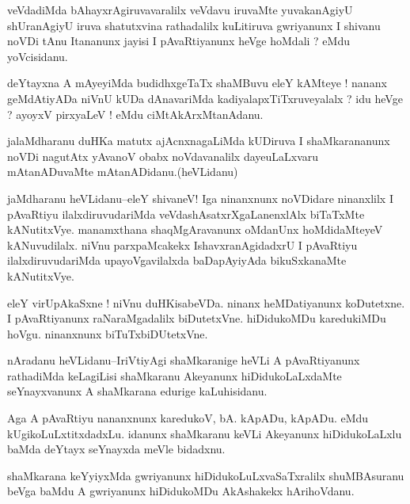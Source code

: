 \documentclass{article}
\begin{document}
\begin{mn}%
veVdadiMda bAhayxrAgiruvavaralilx veVdavu iruvaMte yuvakanAgiyU shUranAgiyU iruva 
shatutxvina rathadalilx kuLitiruva gwriyanunx I shivanu noVDi tAnu Itananunx jayisi I 
pAvaRtiyanunx heVge hoMdali ? eMdu yoVcisidanu.
\end{mn}

\begin{mn}%
deYtayxna A mAyeyiMda budidhxgeTaTx shaMBuvu eleY kAMteye ! nananx geMdAtiyADa niVnU kUDa 
dAnavariMda kadiyalapxTiTxruveyalalx ? idu heVge ? ayoyxV pirxyaLeV ! eMdu 
ciMtAkArxMtanAdanu.
\end{mn}

\begin{mn}%
jalaMdharanu duHKa matutx ajAcnxnagaLiMda kUDiruva I shaMkarananunx noVDi nagutAtx yAvanoV 
obabx noVdavanalilx dayeuLaLxvaru mAtanADuvaMte mAtanADidanu.(heVLidanu)
\end{mn}

\begin{mn}%
jaMdharanu heVLidanu--eleY shivaneV! Iga ninanxnunx noVDidare ninanxlilx I pAvaRtiyu 
ilalxdiruvudariMda veVdashAsatxrXgaLanenxlAlx biTaTxMte kANutitxVye. manamxthana 
shaqMgAravanunx oMdanUnx hoMdidaMteyeV kANuvudilalx. niVnu parxpaMcakekx IshavxranAgidadxrU 
I pAvaRtiyu ilalxdiruvudariMda upayoVgavilalxda baDapAyiyAda bikuSxkanaMte kANutitxVye.
\end{mn}

\begin{mn}%
eleY virUpAkaSxne ! niVnu duHKisabeVDa. ninanx heMDatiyanunx koDutetxne. I pAvaRtiyanunx 
raNaraMgadalilx biDutetxVne. hiDidukoMDu karedukiMDu hoVgu. ninanxnunx biTuTxbiDUtetxVne.
\end{mn}

\begin{mn}%
nAradanu heVLidanu--IriVtiyAgi shaMkaranige heVLi A pAvaRtiyanunx rathadiMda keLagiLisi 
shaMkaranu Akeyanunx hiDidukoLaLxdaMte seYnayxvanunx A shaMkarana edurige kaLuhisidanu.
\end{mn}

\begin{mn}%
Aga A pAvaRtiyu nananxnunx karedukoV, bA. kApADu, kApADu. eMdu kUgikoLuLxtitxdadxLu. idanunx 
shaMkaranu keVLi Akeyanunx hiDidukoLaLxlu baMda deYtayx seYnayxda meVle bidadxnu.
\end{mn}

\begin{mn}%
shaMkarana keYyiyxMda gwriyanunx hiDidukoLuLxvaSaTxralilx shuMBAsuranu beVga baMdu A 
gwriyanunx hiDidukoMDu AkAshakekx hArihoVdanu.
\end{mn}
\end{document}
